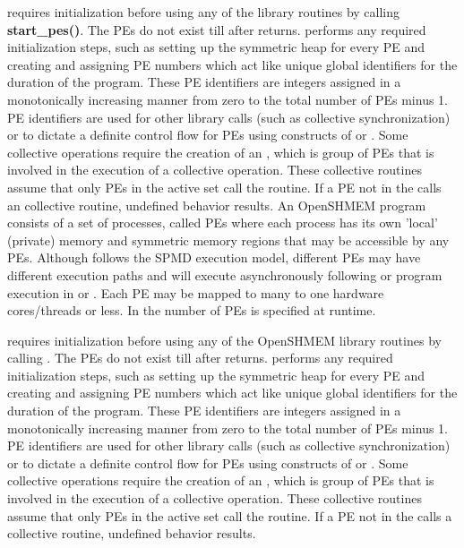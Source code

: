 \openshmem requires initialization before using any of the \openshmem library
routines by calling \textbf{start\_pes()}.  %
The \ac{PE}s do not exist till after  returns.  performs any required initialization steps, such as setting up the symmetric heap for every \ac{PE} and creating and assigning \ac{PE} numbers which act like unique global identifiers for the duration of the program. These \ac{PE} identifiers are integers assigned in a monotonically increasing manner from zero to the total number of \ac{PE}s minus 1. \ac{PE} identifiers are used for other \openshmem library calls (such as collective synchronization) or to dictate a definite control flow for \ac{PE}s using constructs of \Clang{} or \Fortran. Some collective operations require the creation of an \activeset, which is  group of \ac{PE}s that is involved in the execution of a collective operation. These collective routines assume that only \ac{PE}s in the active set call the routine. If a \ac{PE} not in the \activeset{} calls an \openshmem collective routine, undefined  behavior results.
An OpenSHMEM program consists of a set of processes, called \ac{PE}s where each process has its own 'local' (private) memory and symmetric memory regions that may be accessible by any \ac{PE}s.
Although \openshmem follows the \ac{SPMD} execution model, different \ac{PE}s may have different execution paths and will execute asynchronously following \Fortran{} or program execution in \Clang{} or \Cpp.  Each PE may be mapped to many to one hardware cores/threads or less. In \openshmem the number of \ac{PE}s is specified at runtime.

\openshmem requires initialization before using any of the OpenSHMEM library
routines by calling .%
The \ac{PE}s do not exist till after  returns.  performs any required initialization steps, such as setting up the symmetric heap for every \ac{PE} and creating and assigning \ac{PE} numbers 
which act like unique global identifiers for the duration of the program. These \ac{PE} identifiers are integers assigned in a monotonically increasing manner from zero to the total number of \ac{PE}s minus 1. \ac{PE} identifiers 
are used for other \openshmem library calls (such as collective synchronization) or to dictate a definite control flow for \ac{PE}s using constructs of \Clang{} or \Fortran{}. Some collective operations require the creation of an 
\activeset, which is  group of \ac{PE}s that is involved in the execution of a collective operation. These collective routines assume that only \ac{PE}s in the active set call the routine. If a \ac{PE} not in the \activeset{} calls a 
\openshmem collective routine, undefined  behavior results.

